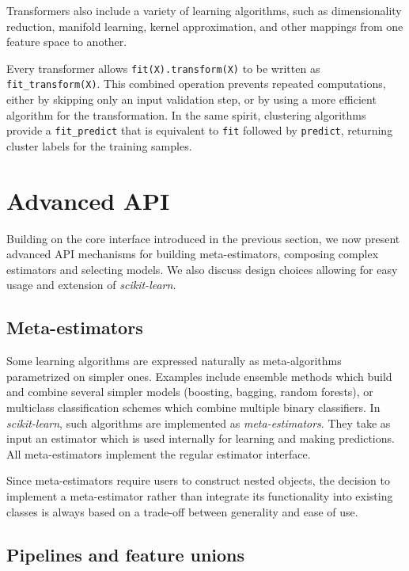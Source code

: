 \documentclass[twocolumn]{article}
\newcommand{\sklearn}{\textit{scikit-learn}\xspace}
\begin{document}
Transformers also include a variety of learning algorithms, such as
dimensionality reduction, manifold learning, kernel approximation,
and other mappings from one feature space to another.

Every transformer allows \texttt{fit(X).transform(X)}
to be written as \texttt{fit\_transform(X)}.
This combined operation prevents repeated computations,
either by skipping only an input validation step,
or by using a more efficient algorithm for the transformation.
In the same spirit, clustering algorithms provide a \texttt{fit\_predict}
that is equivalent to \texttt{fit} followed by \texttt{predict},
returning cluster labels for the training samples.


\section{Advanced API}

\label{sec:advanced-api}

Building on the core interface introduced in the previous section, we now
present advanced API mechanisms for building meta-estimators,
composing complex estimators and selecting models. We also discuss design
choices allowing for easy usage and extension of \sklearn.

\subsection{Meta-estimators}

Some learning algorithms are expressed naturally
as meta-algorithms parametrized on simpler ones.
Examples include ensemble methods which
build and combine several simpler models (boosting, bagging, random forests),
or multiclass classification schemes which combine multiple binary classifiers.
In \sklearn, such algorithms are implemented as \textit{meta-estimators}.
They take as input an estimator which is used
internally for learning and making predictions.
All meta-estimators implement the regular estimator interface.

Since meta-estimators require users to construct nested objects,
the decision to implement a meta-estimator
rather than integrate its functionality
into existing classes
is always based on a trade-off between generality and ease of use.

\subsection{Pipelines and feature unions}
\end{document}
